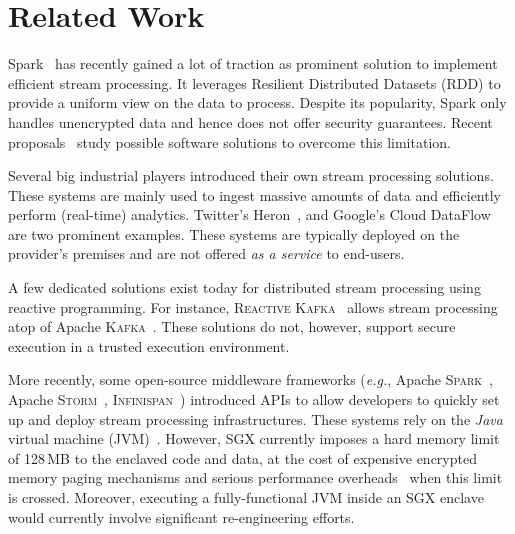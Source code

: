 \section{Related Work}\label{sec:rw}


Spark~\cite{Zaharia:2013:DSF:2517349.2522737} has recently gained a lot of traction as prominent solution to implement efficient stream processing.
It leverages Resilient Distributed Datasets (RDD) to provide a uniform view on the data to process.
Despite its popularity, Spark only handles unencrypted data and hence does not offer security guarantees.
Recent proposals~\cite{7840754} study possible software solutions to overcome this limitation.

Several big industrial players introduced their own stream processing solutions.
These systems are mainly used to ingest massive amounts of data and efficiently perform (real-time) analytics.
Twitter's Heron~\cite{Kulkarni:2015:THS:2723372.2742788}, and Google's Cloud DataFlow~\cite{Akidau:2015:DMP:2824032.2824076} are two prominent examples.
These systems are typically deployed on the provider's premises and are not offered \emph{as a service} to end-users.

A few dedicated solutions exist today for distributed stream processing using reactive programming.
For instance, \textsc{Reactive Kafka}~\cite{reactivekafka} allows stream processing atop of Apache \textsc{Kafka}~\cite{apachekafka,kreps2011kafka}.
These solutions do not, however, support secure execution in a trusted execution environment.

More recently, some open-source middleware frameworks (\emph{e.g.}, Apache \textsc{Spark}~\cite{apachesparkstreaming}, Apache \textsc{Storm}~\cite{apachestorm}, \textsc{Infinispan}~\cite{infinispan}) introduced APIs to allow developers to quickly set up and deploy stream processing infrastructures.
These systems rely on the \emph{Java} virtual machine (JVM)~\cite{lindholm2014java}.
However, SGX currently imposes a hard memory limit of 128\,MB to the enclaved code and data, at the cost of expensive encrypted memory paging mechanisms and serious performance overheads~\cite{pires_scbr:2016,brenner_securekeeper:_2016} when this limit is crossed.
Moreover, executing a fully-functional JVM inside an SGX enclave would currently involve significant re-engineering efforts.

